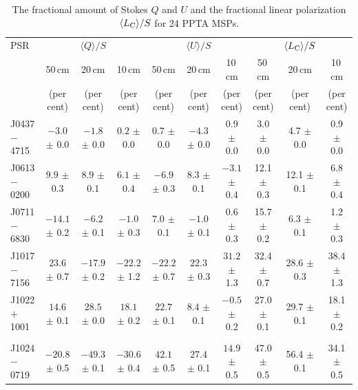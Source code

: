 \documentclass[useAMS,usenatbib]{mn2e}
\begin{document}
%
\begin{table}
\begin{center}
\caption{The fractional amount of Stokes $Q$ and $U$ and the 
fractional linear polarization $\langle L_{\rm{C}} \rangle/S$ for 24 PPTA MSPs.}
\label{tablePol2}
\begin{tabular}{lccccccccc}
\hline
PSR              &                  &    $\langle Q \rangle/S$    &                  &               & $\langle U \rangle/S$       &                  &      &      $\langle L_{\rm{C}}\rangle/S$       &                      \\
								 &    50\,cm      &   20\,cm       &    10\,cm &    50\,cm      &   20\,cm       &    10\,cm &    50\,cm      &   20\,cm       &    10\,cm              \\
								 &     (per cent)   &         (per cent)          &     (per cent)   &    (per cent)   &         (per cent)          &     (per cent)   &   (per cent)   &         (per cent)          &     (per cent)  \\
\hline
J0437$-$4715 &$-3.0 $ $\pm$ 0.0 & $-1.8 $ $\pm$ 0.0 & $0.2  $ $\pm$ 0.0 & $0.7  $ $\pm$ 0.0 & $-4.3 $ $\pm$ 0.0 & $0.9  $ $\pm$ 0.0 & 3.0  $\pm$ 0.0 & 4.7  $\pm$ 0.0 & 0.9  $\pm$ 0.0 \\
J0613$-$0200 &$9.9  $ $\pm$ 0.3 & $8.9  $ $\pm$ 0.1 & $6.1  $ $\pm$ 0.4 & $-6.9 $ $\pm$ 0.3 & $8.3  $ $\pm$ 0.1 & $-3.1 $ $\pm$ 0.4 & 12.1 $\pm$ 0.3 & 12.1 $\pm$ 0.1 & 6.8  $\pm$ 0.4 \\
J0711$-$6830 &$-14.1$ $\pm$ 0.2 & $-6.2 $ $\pm$ 0.1 & $-1.0 $ $\pm$ 0.3 & $7.0  $ $\pm$ 0.1 & $-1.0 $ $\pm$ 0.1 & $0.6  $ $\pm$ 0.3 & 15.7 $\pm$ 0.2 & 6.3  $\pm$ 0.1 & 1.2  $\pm$ 0.3 \\
J1017$-$7156 &$23.6 $ $\pm$ 0.7 & $-17.9$ $\pm$ 0.2 & $-22.2$ $\pm$ 1.2 & $-22.2$ $\pm$ 0.7 & $22.3 $ $\pm$ 0.3 & $31.2 $ $\pm$ 1.3 & 32.4 $\pm$ 0.7 & 28.6 $\pm$ 0.3 & 38.4 $\pm$ 1.3 \\
J1022$+$1001 &$14.6 $ $\pm$ 0.1 & $28.5 $ $\pm$ 0.0 & $18.1 $ $\pm$ 0.2 & $22.7 $ $\pm$ 0.1 & $8.4  $ $\pm$ 0.1 & $-0.5 $ $\pm$ 0.2 & 27.0 $\pm$ 0.1 & 29.7 $\pm$ 0.1 & 18.1 $\pm$ 0.2 \\
             &                &                 &                &                   &                   &                   &                &                &                 \\
J1024$-$0719 &$-20.8$ $\pm$ 0.5 & $-49.3$ $\pm$ 0.1 & $-30.6$ $\pm$ 0.4 & $42.1 $ $\pm$ 0.5 & $27.4 $ $\pm$ 0.1 & $14.9 $ $\pm$ 0.5 & 47.0 $\pm$ 0.5 & 56.4 $\pm$ 0.1 & 34.1 $\pm$ 0.5 \\

\end{tabular}
\end{center}
\end{table}
\end{document}
